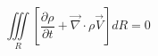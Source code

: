 
\begin{equation}
\iiint\limits_R \left[\frac{\partial\rho}{\partial t} + \overrightarrow{\nabla}\cdot\rho\overrightarrow{V}\right] dR = 0
\end{equation}

